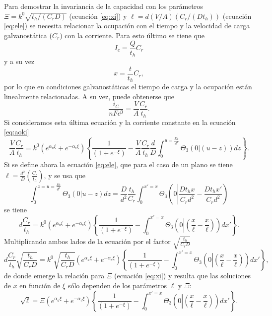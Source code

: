 Para demostrar la invariancia de la capacidad con los parámetros 
$\Xi = k^0 \sqrt{t_h / (C_r D)}$ (ecuación \ref{eq:xi}) y 
$\ell = d (V/A) (C_r / (D t_h))$ (ecuación \ref{eq:ele}) se necesita relacionar 
la ocupación con el tiempo y la velocidad de carga galvanostática ($C_r$) con
la corriente. Para esto último se tiene que
\begin{equation}
    I_c = \frac{Q}{t_h} C_r
\end{equation}
y a su vez
\begin{equation}
    x = \frac{t}{t_h} C_r,
\end{equation}
por lo que en condiciones galvanostáticas el tiempo de carga y la ocupación 
están linealmente relacionadas. A su vez, puede obtenerse que
\begin{equation}
    \frac{i_C}{nFc^0} = \frac{V}{A} \frac{C_r}{t_h}.
\end{equation}
Si consideramos esta última ecuación y la corriente constante en la ecuación 
\ref{eq:aoki}
\begin{equation}
    \frac{V}{A} \frac{C_r}{t_h} = k^0 (e^{\alpha_a \xi} + e^{-\alpha_c \xi}) \left\{ \frac{1}{(1 + e^{-\xi})} - \frac{V}{A}\frac{C_r}{t_h}\frac{d}{D} \int_0^{u=\frac{Dt}{d^2}} \Theta_3\left(0 \left| (u - z)\right.\right) dz \right\}.
\end{equation}
Si se define ahora la ecuación \ref{eq:ele}, que para el caso de un plano se tiene
$\ell = \frac{d^2}{D} \left(\frac{C_r}{t_h}\right)$, y se usa que
\begin{equation}
    \int_0^{z=u=\frac{Dt}{d^3}} \Theta_3(0|u-z)dz = \frac{D}{d^2} \frac{t_h}{C_r} \int_0^{x'=x} \Theta_3\left(0\left|\frac{D t_h x}{C_r d^2} - \frac{D t_h x'}{C_r d^2}\right.\right)
\end{equation}
se tiene
\begin{equation}
    d \frac{C_r}{t_h} = k^0 (e^{\alpha_a \xi} + e^{-\alpha_c \xi}) \left\{ \frac{1}{(1 + e^{-\xi})} - \int_0^{x'=x} \Theta_3\left(0 \left| \left(\frac{x}{\ell}- \frac{x}{\ell}\right)\right.\right) dx' \right\}.
\end{equation}
Multiplicando ambos lados de la ecuación por el factor $\sqrt{\frac{t_h}{C_r D}}$
\begin{equation}
    d \frac{C_r}{t_h} \sqrt{\frac{t_h}{C_r D}} = k^0 \sqrt{\frac{t_h}{C_r D}} (e^{\alpha_a \xi} + e^{-\alpha_c \xi}) \left\{ \frac{1}{(1 + e^{-\xi})} - \int_0^{x'=x} \Theta_3\left(0 \left| \left(\frac{x}{\ell}- \frac{x}{\ell}\right)\right.\right) dx' \right\},
\end{equation}
de donde emerge la relación para $\Xi$ (ecuación \ref{eq:xi}) y resulta que las 
soluciones de $x$ en función de $\xi$ sólo dependen de los parámetros $\ell$ y
$\Xi$:
\begin{equation}
    \sqrt{\ell} = \Xi (e^{\alpha_a \xi} + e^{-\alpha_c \xi}) \left\{ \frac{1}{(1 + e^{-\xi})} - \int_0^{x'=x} \Theta_3\left(0 \left| \left(\frac{x}{\ell}- \frac{x}{\ell}\right)\right.\right) dx' \right\}.
\end{equation}

